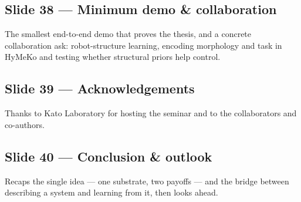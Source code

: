 \documentclass[10pt]{article}
\begin{document}
\subsection*{Slide 38 --- Minimum demo \& collaboration}
The smallest end-to-end demo that proves the thesis, and a concrete collaboration ask: robot-structure learning, encoding morphology and task in HyMeKo and testing whether structural priors help control.

\subsection*{Slide 39 --- Acknowledgements}
Thanks to Kato Laboratory for hosting the seminar and to the collaborators and co-authors.

\subsection*{Slide 40 --- Conclusion \& outlook}
Recaps the single idea --- one substrate, two payoffs --- and the bridge between describing a system and learning from it, then looks ahead.
\end{document}
